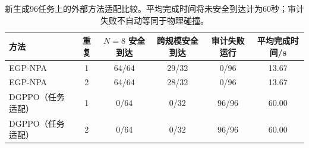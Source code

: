 \begin{table}[t]
\centering\footnotesize
\caption{新生成96任务上的外部方法适配比较。平均完成时间将未安全到达计为60秒；审计失败不自动等同于物理碰撞。}\label{tab:external}
\begin{tabularx}{\textwidth}{@{}Xccccc@{}}\toprule
方法 & 重复 & $N=8$ 安全到达 & 跨规模安全到达 & 审计失败运行 & 平均完成时间/s\\\midrule
EGP-NPA & 1 & 64/64 & 29/32 & 0/96 & 13.67 \\
EGP-NPA & 2 & 64/64 & 28/32 & 0/96 & 13.67 \\
DGPPO（任务适配） & 1 & 0/64 & 0/32 & 96/96 & 60.00 \\
DGPPO（任务适配） & 2 & 0/64 & 0/32 & 96/96 & 60.00 \\
\bottomrule\end{tabularx}
\end{table}
